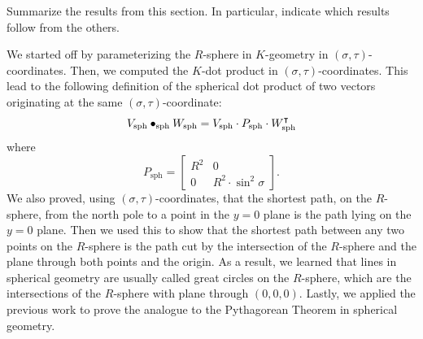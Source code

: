 \documentclass{ximera}
\begin{document}
\begin{problem}
Summarize the results from this section. In particular, indicate which
results follow from the others.
\begin{freeResponse}
We started off by parameterizing the $R$-sphere in $K$-geometry in $\left(\sigma,\tau \right)$-coordinates. Then, we computed the $K$-dot product in  $\left(\sigma,\tau \right)$-coordinates. This lead to the following definition of the spherical dot product of two vectors originating at the same $\left(\sigma,\tau \right)$-coordinate: 
\[
  V_\mathrm{sph} \bullet_\mathrm{sph} W_\mathrm{sph} = V_\mathrm{sph} \cdot P_\mathrm{sph} \cdot W_\mathrm{sph}^\intercal
  \]
  where
  \[
  P_\mathrm{sph} =
  \begin{bmatrix}
    R^2 & 0 \\
    0 & R^2\cdot\sin^2 \sigma
  \end{bmatrix}.
  \]
We also proved, using $\left(\sigma,\tau \right)$-coordinates, that the shortest path, on the $R$-sphere, from the north pole to a point in the $y=0$ plane is the path lying on the $y=0$ plane. Then we used this to show that the shortest path between any two points on the $R$-sphere is the path cut by the intersection of the $R$-sphere and the plane through both points and the origin. As a result, we learned that lines in spherical geometry are usually called great circles on the $R$-sphere, which are the intersections of the $R$-sphere with plane through $\left(0, 0, 0\right)$. Lastly, we applied the previous work to prove the analogue to the Pythagorean Theorem in spherical geometry. 
\end{freeResponse}
\end{problem}
\end{document}
